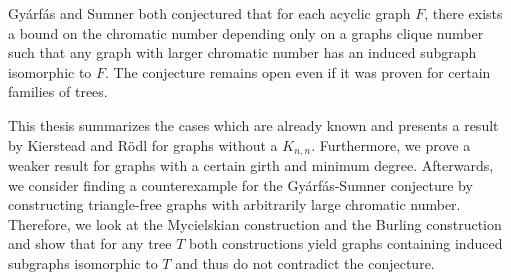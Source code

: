 Gyárfás and Sumner both conjectured that for each acyclic graph $F$, there exists a bound on the chromatic number depending only on a graphs clique number such that any graph with larger chromatic number has an induced subgraph isomorphic to $F$. The conjecture remains open even if it was proven for certain families of trees.

This thesis summarizes the cases which are already known and presents a result by Kierstead and Rödl for graphs without a $K_{n,n}$. Furthermore, we prove a weaker result for graphs with a certain girth and minimum degree. Afterwards, we consider finding a counterexample for the Gyárfás-Sumner conjecture by constructing triangle-free graphs with arbitrarily large chromatic number. Therefore, we look at the Mycielskian construction and the Burling construction and show that for any tree $T$ both constructions yield graphs containing induced subgraphs isomorphic to $T$ and thus do not contradict the conjecture.